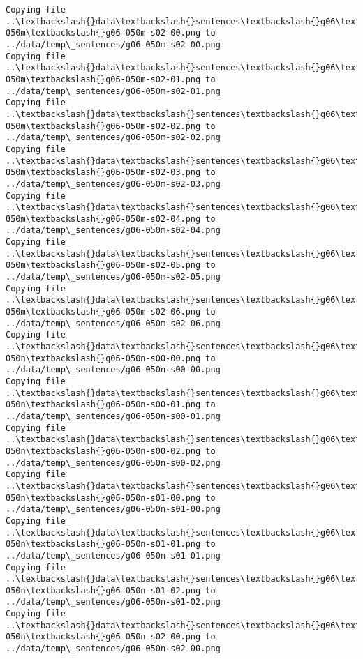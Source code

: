 \documentclass[11pt]{article}
\begin{document}
\begin{Verbatim}[commandchars=\\\{\}]
Copying file ..\textbackslash{}data\textbackslash{}sentences\textbackslash{}g06\textbackslash{}g06-050m\textbackslash{}g06-050m-s02-00.png to
../data/temp\_sentences/g06-050m-s02-00.png
Copying file ..\textbackslash{}data\textbackslash{}sentences\textbackslash{}g06\textbackslash{}g06-050m\textbackslash{}g06-050m-s02-01.png to
../data/temp\_sentences/g06-050m-s02-01.png
Copying file ..\textbackslash{}data\textbackslash{}sentences\textbackslash{}g06\textbackslash{}g06-050m\textbackslash{}g06-050m-s02-02.png to
../data/temp\_sentences/g06-050m-s02-02.png
Copying file ..\textbackslash{}data\textbackslash{}sentences\textbackslash{}g06\textbackslash{}g06-050m\textbackslash{}g06-050m-s02-03.png to
../data/temp\_sentences/g06-050m-s02-03.png
Copying file ..\textbackslash{}data\textbackslash{}sentences\textbackslash{}g06\textbackslash{}g06-050m\textbackslash{}g06-050m-s02-04.png to
../data/temp\_sentences/g06-050m-s02-04.png
Copying file ..\textbackslash{}data\textbackslash{}sentences\textbackslash{}g06\textbackslash{}g06-050m\textbackslash{}g06-050m-s02-05.png to
../data/temp\_sentences/g06-050m-s02-05.png
Copying file ..\textbackslash{}data\textbackslash{}sentences\textbackslash{}g06\textbackslash{}g06-050m\textbackslash{}g06-050m-s02-06.png to
../data/temp\_sentences/g06-050m-s02-06.png
Copying file ..\textbackslash{}data\textbackslash{}sentences\textbackslash{}g06\textbackslash{}g06-050n\textbackslash{}g06-050n-s00-00.png to
../data/temp\_sentences/g06-050n-s00-00.png
Copying file ..\textbackslash{}data\textbackslash{}sentences\textbackslash{}g06\textbackslash{}g06-050n\textbackslash{}g06-050n-s00-01.png to
../data/temp\_sentences/g06-050n-s00-01.png
Copying file ..\textbackslash{}data\textbackslash{}sentences\textbackslash{}g06\textbackslash{}g06-050n\textbackslash{}g06-050n-s00-02.png to
../data/temp\_sentences/g06-050n-s00-02.png
Copying file ..\textbackslash{}data\textbackslash{}sentences\textbackslash{}g06\textbackslash{}g06-050n\textbackslash{}g06-050n-s01-00.png to
../data/temp\_sentences/g06-050n-s01-00.png
Copying file ..\textbackslash{}data\textbackslash{}sentences\textbackslash{}g06\textbackslash{}g06-050n\textbackslash{}g06-050n-s01-01.png to
../data/temp\_sentences/g06-050n-s01-01.png
Copying file ..\textbackslash{}data\textbackslash{}sentences\textbackslash{}g06\textbackslash{}g06-050n\textbackslash{}g06-050n-s01-02.png to
../data/temp\_sentences/g06-050n-s01-02.png
Copying file ..\textbackslash{}data\textbackslash{}sentences\textbackslash{}g06\textbackslash{}g06-050n\textbackslash{}g06-050n-s02-00.png to
../data/temp\_sentences/g06-050n-s02-00.png

\end{Verbatim}
\end{document}
